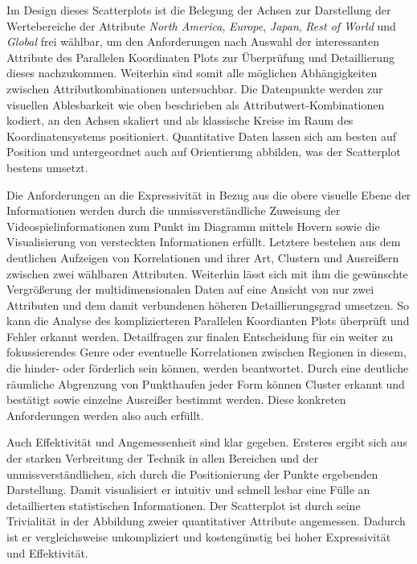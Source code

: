 \documentclass[usegeometry=true]{scrartcl}
\begin{document}
Im Design dieses Scatterplots ist die Belegung der Achsen zur Darstellung der Wertebereiche der Attribute \textit{North America}, \textit{Europe}, \textit{Japan}, \textit{Rest of World} und \textit{Global} frei wählbar, 
um den Anforderungen nach Auswahl der interessanten Attribute des Parallelen Koordinaten Plots zur Überprüfung und Detaillierung dieses nachzukommen.
Weiterhin sind somit alle möglichen Abhängigkeiten zwischen Attributkombinationen untersuchbar. 
Die Datenpunkte werden zur visuellen Ablesbarkeit wie oben beschrieben als Attributwert-Kombinationen kodiert, an den Achsen skaliert und als klassische Kreise im Raum des Koordinatensystems positioniert. 
Quantitative Daten lassen sich am besten auf Position und untergeordnet auch auf Orientierung abbilden, was der Scatterplot bestens umsetzt.\cite{Bertin.1982}

Die Anforderungen an die Expressivität in Bezug aus die obere visuelle Ebene der Informationen werden durch die unmissverständliche Zuweisung der Videospielinformationen zum Punkt im Diagramm mittels Hovern sowie die Visualisierung von 
versteckten Informationen erfüllt. 
Letztere bestehen aus dem deutlichen Aufzeigen von Korrelationen und ihrer Art, Clustern und Ausreißern zwischen zwei wählbaren Attributen.
Weiterhin lässt sich mit ihm die gewünschte Vergrößerung der multidimensionalen Daten auf eine Ansicht von nur zwei Attributen und dem damit verbundenen höheren Detaillierungsgrad umsetzen. 
So kann die Analyse des komplizierteren Parallelen Koordianten Plots überprüft und Fehler erkannt werden. 
Detailfragen zur finalen Entscheidung für ein weiter zu fokussierendes Genre oder eventuelle Korrelationen zwischen Regionen in diesem, die hinder- oder förderlich sein können, werden beantwortet. 
Durch eine deutliche räumliche Abgrenzung von Punkthaufen jeder Form können Cluster erkannt und bestätigt sowie einzelne Ausreißer bestimmt werden.
Diese konkreten Anforderungen werden also auch erfüllt.

Auch Effektivität und Angemessenheit sind klar gegeben. 
Ersteres ergibt sich aus der starken Verbreitung der Technik in allen Bereichen und der unmissverständlichen, sich durch die Positionierung der Punkte ergebenden Darstellung. 
Damit visualisiert er intuitiv und schnell lesbar eine Fülle an detaillierten statistischen Informationen.
Der Scatterplot ist durch seine Trivialität in der Abbildung zweier quantitativer Attribute angemessen. 
Dadurch ist er vergleichsweise unkompliziert und kostengünstig bei hoher Expressivität und Effektivität.
\end{document}
